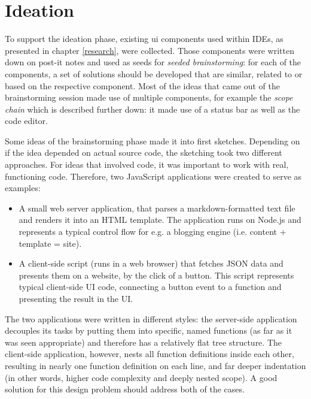 \section{Ideation}\label{ideation}

To support the ideation phase, existing \ac{ui} components used within
IDEs, as presented in chapter \ref{research}, were collected. Those
components were written down on post-it notes and used as seeds for
\emph{seeded brainstorming}: for each of the components, a set of
solutions should be developed that are similar, related to or based on
the respective component. Most of the ideas that came out of the
brainstorming session made use of multiple components, for example the
\emph{scope chain} which is described further down: it made use of a
status bar as well as the code editor.

Some ideas of the brainstorming phase made it into first sketches.
Depending on if the idea depended on actual source code, the sketching
took two different approaches. For ideas that involved code, it was
important to work with real, functioning code. Therefore, two JavaScript
applications were created to serve as examples:

\begin{itemize}
\itemsep1pt\parskip0pt
\item
  A small web server application, that parses a markdown-formatted text
  file and renders it into an HTML template. The application runs on
  Node.js and represents a typical control flow for e.g. a blogging
  engine (i.e. content + template = site).
\item
  A client-side script (runs in a web browser) that fetches JSON data
  and presents them on a website, by the click of a button. This script
  represents typical client-side UI code, connecting a button event to a
  function and presenting the result in the UI.
\end{itemize}

The two applications were written in different styles: the server-side
application decouples its tasks by putting them into specific, named
functions (as far as it was seen appropriate) and therefore has a
relatively flat tree structure. The client-side application, however,
nests all function definitions inside each other, resulting in nearly
one function definition on each line, and far deeper indentation (in
other words, higher code complexity and deeply nested scope). A good
solution for this design problem should address both of the cases.

